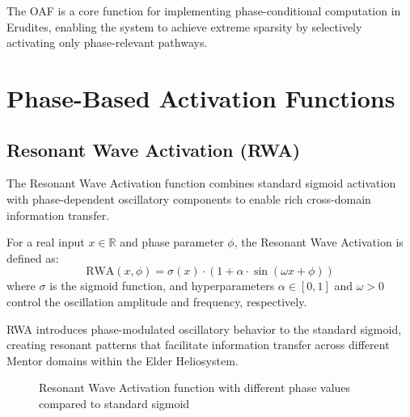 The OAF is a core function for implementing phase-conditional computation in Erudites, enabling the system to achieve extreme sparsity by selectively activating only phase-relevant pathways.

\section{Phase-Based Activation Functions}

\subsection{Resonant Wave Activation (RWA)}

The Resonant Wave Activation function combines standard sigmoid activation with phase-dependent oscillatory components to enable rich cross-domain information transfer.

\begin{definition}
For a real input $x \in \mathbb{R}$ and phase parameter $\phi$, the Resonant Wave Activation is defined as:
\begin{equation}
\text{RWA}(x, \phi) = \sigma(x) \cdot (1 + \alpha \cdot \sin(\omega x + \phi))
\end{equation}
where $\sigma$ is the sigmoid function, and hyperparameters $\alpha \in [0,1]$ and $\omega > 0$ control the oscillation amplitude and frequency, respectively.
\end{definition}

RWA introduces phase-modulated oscillatory behavior to the standard sigmoid, creating resonant patterns that facilitate information transfer across different Mentor domains within the Elder Heliosystem.

\begin{figure}[h]
\centering
{}
\caption{Resonant Wave Activation function with different phase values compared to standard sigmoid}
\end{figure}

